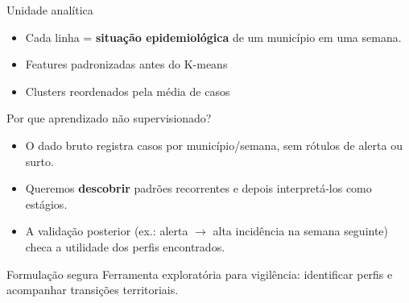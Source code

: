 \documentclass[aspectratio=169,xcolor=table]{beamer}
\begin{document}
\begin{frame}{Unidade anal\'itica}
    \begin{center}
    \end{center}

    \begin{itemize}
        \item Cada linha = \textbf{situa\c{c}\~ao epidemiol\'ogica} de um munic\'ipio em uma semana.
        \item Features padronizadas antes do K-means
        \item Clusters reordenados pela m\'edia de casos
    \end{itemize}
\end{frame}

\begin{frame}{Por que aprendizado n\~ao supervisionado?}
    \begin{itemize}
        \item O dado bruto registra casos por munic\'ipio/semana, sem r\'otulos de alerta ou surto.
        \item Queremos \textbf{descobrir} padr\~oes recorrentes e depois interpret\'a-los como est\'agios.
        \item A valida\c{c}\~ao posterior (ex.: alerta $\rightarrow$ alta incid\^encia na semana seguinte) checa a utilidade dos perfis encontrados.
    \end{itemize}

    \begin{block}{Formula\c{c}\~ao segura}
        Ferramenta explorat\'oria para vigil\^encia: identificar perfis e acompanhar transi\c{c}\~oes territoriais.
    \end{block}
\end{frame}
\end{document}
